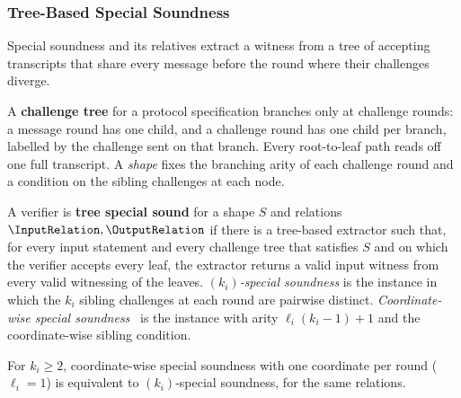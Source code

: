 \subsubsection{Tree-Based Special Soundness}\label{sec:tree_special_soundness}

Special soundness and its relatives extract a witness from a tree of accepting transcripts that
share every message before the round where their challenges diverge.

\begin{definition}
    \label{def:challenge_tree}
    A \textbf{challenge tree} for a protocol specification branches only at challenge rounds: a
    message round has one child, and a challenge round has one child per branch, labelled by the
    challenge sent on that branch. Every root-to-leaf path reads off one full transcript. A
    \emph{shape} fixes the branching arity of each challenge round and a condition on the sibling
    challenges at each node.
    \leanok
\end{definition}

\begin{definition}
    \label{def:tree_special_soundness}
    A verifier is \textbf{tree special sound} for a shape \(S\) and relations
    \(\InputRelation, \OutputRelation\) if there is a tree-based extractor such that, for every input
    statement and every challenge tree that satisfies \(S\) and on which the verifier accepts every
    leaf, the extractor returns a valid input witness from every valid witnessing of the leaves.
    \emph{\((k_i)\)-special soundness} is the instance in which the \(k_i\) sibling challenges at
    each round are pairwise distinct. \emph{Coordinate-wise special soundness}~\cite{FMN24} is the
    instance with arity \(\ell_i(k_i - 1) + 1\) and the coordinate-wise sibling condition.
    \leanok
\end{definition}

\begin{theorem}
    \label{thm:cwss_of_special_sound_iff}
    For \(k_i \geq 2\), coordinate-wise special soundness with one coordinate per round (\(\ell_i = 1\))
    is equivalent to \((k_i)\)-special soundness, for the same relations.
    \leanok
\end{theorem}

